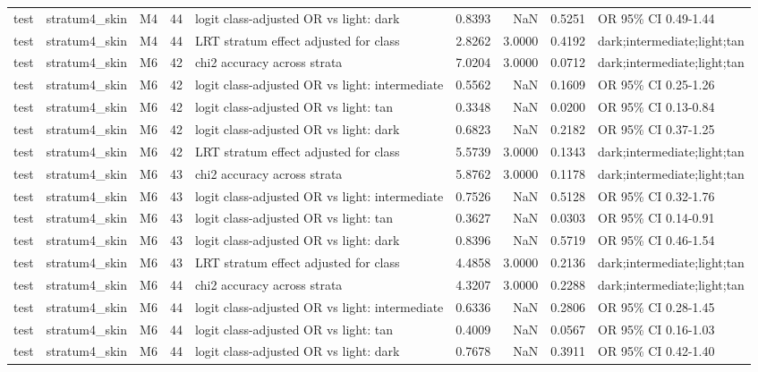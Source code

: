 \begin{tabular}{lllrlrrrl}
test & stratum4\_skin & M4 & 44 & logit class-adjusted OR vs light: dark & 0.8393 & NaN & 0.5251 & OR 95\% CI 0.49-1.44 \\
test & stratum4\_skin & M4 & 44 & LRT stratum effect adjusted for class & 2.8262 & 3.0000 & 0.4192 & dark;intermediate;light;tan \\
test & stratum4\_skin & M6 & 42 & chi2 accuracy across strata & 7.0204 & 3.0000 & 0.0712 & dark;intermediate;light;tan \\
test & stratum4\_skin & M6 & 42 & logit class-adjusted OR vs light: intermediate & 0.5562 & NaN & 0.1609 & OR 95\% CI 0.25-1.26 \\
test & stratum4\_skin & M6 & 42 & logit class-adjusted OR vs light: tan & 0.3348 & NaN & 0.0200 & OR 95\% CI 0.13-0.84 \\
test & stratum4\_skin & M6 & 42 & logit class-adjusted OR vs light: dark & 0.6823 & NaN & 0.2182 & OR 95\% CI 0.37-1.25 \\
test & stratum4\_skin & M6 & 42 & LRT stratum effect adjusted for class & 5.5739 & 3.0000 & 0.1343 & dark;intermediate;light;tan \\
test & stratum4\_skin & M6 & 43 & chi2 accuracy across strata & 5.8762 & 3.0000 & 0.1178 & dark;intermediate;light;tan \\
test & stratum4\_skin & M6 & 43 & logit class-adjusted OR vs light: intermediate & 0.7526 & NaN & 0.5128 & OR 95\% CI 0.32-1.76 \\
test & stratum4\_skin & M6 & 43 & logit class-adjusted OR vs light: tan & 0.3627 & NaN & 0.0303 & OR 95\% CI 0.14-0.91 \\
test & stratum4\_skin & M6 & 43 & logit class-adjusted OR vs light: dark & 0.8396 & NaN & 0.5719 & OR 95\% CI 0.46-1.54 \\
test & stratum4\_skin & M6 & 43 & LRT stratum effect adjusted for class & 4.4858 & 3.0000 & 0.2136 & dark;intermediate;light;tan \\
test & stratum4\_skin & M6 & 44 & chi2 accuracy across strata & 4.3207 & 3.0000 & 0.2288 & dark;intermediate;light;tan \\
test & stratum4\_skin & M6 & 44 & logit class-adjusted OR vs light: intermediate & 0.6336 & NaN & 0.2806 & OR 95\% CI 0.28-1.45 \\
test & stratum4\_skin & M6 & 44 & logit class-adjusted OR vs light: tan & 0.4009 & NaN & 0.0567 & OR 95\% CI 0.16-1.03 \\
test & stratum4\_skin & M6 & 44 & logit class-adjusted OR vs light: dark & 0.7678 & NaN & 0.3911 & OR 95\% CI 0.42-1.40 \\

\end{tabular}
